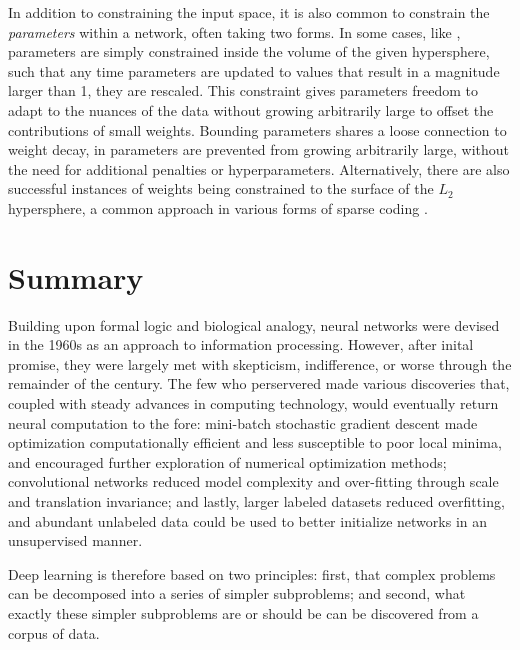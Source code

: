 In addition to constraining the input space, it is also common to constrain the \emph{parameters} within a network, often taking two forms.
In some cases, like \cite{HintonDropout}, parameters are simply constrained inside the volume of the given hypersphere, such that any time parameters are updated to values that result in a magnitude larger than 1, they are rescaled.
This constraint gives parameters freedom to adapt to the nuances of the data without growing arbitrarily large to offset the contributions of small weights.
Bounding parameters shares a loose connection to weight decay, in parameters are prevented from growing arbitrarily large, without the need for additional penalties or hyperparameters.
Alternatively, there are also successful instances of weights being constrained to the surface of the $L_2$ hypersphere, a common approach in various forms of sparse coding \cite{Koray}.


\section{Summary}
\label{sec:deep_summary}

Building upon formal logic and biological analogy, neural networks were devised in the 1960s as an approach to information processing.
However, after inital promise, they were largely met with skepticism, indifference, or worse through the remainder of the century.
The few who perservered made various discoveries that, coupled with steady advances in computing technology, would eventually return neural computation to the fore:
mini-batch stochastic gradient descent made optimization computationally efficient and less susceptible to poor local minima, and encouraged further exploration of numerical optimization methods;
convolutional networks reduced model complexity and over-fitting through scale and translation invariance;
and lastly, larger labeled datasets reduced overfitting, and abundant unlabeled data could be used to better initialize networks in an unsupervised manner.

Deep learning is therefore based on two principles: first, that complex problems can be decomposed into a series of simpler subproblems; and second, what exactly these simpler subproblems are or should be can be discovered from a corpus of data.
